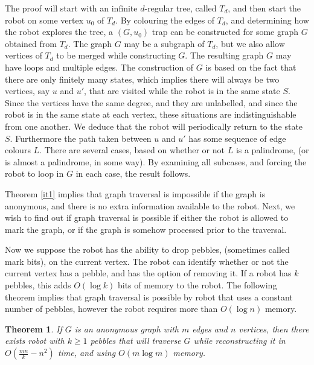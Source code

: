 \documentclass[12pt,letterpaper,oneside]{book}
\newtheorem{theorem}{Theorem}[section]
\begin{document}
The proof will start with an infinite $d$-regular tree, called $T_d$, and then start the robot on some vertex $u_0$ of $T_d$.  
By colouring the edges of $T_d$, and determining how the robot explores the tree, a $(G,u_0)$ trap can be constructed 
for some graph $G$ obtained from $T_d$.  The graph $G$ may be a subgraph of $T_d$, but we also allow vertices of $T_d$ to be 
merged while constructing $G$.  The resulting graph $G$ may have loops and multiple edges.    
The construction of $G$ is based 
on the fact that there are only finitely many states, which implies 
there will always be two vertices, say $u$ and $u'$, that are visited while the robot is in the same state $S$.  Since 
the vertices have the same degree, and they are unlabelled, and since the robot is in the same state at each vertex, these situations 
are indistinguishable from one another.  We deduce 
that the robot will periodically return to the state $S$.  Furthermore the path taken between $u$ and $u'$ has some sequence of edge colours $L$.  
There are several cases, based on whether or not $L$ is a palindrome, (or is almost a palindrome, in some way).  By examining 
all subcases, and forcing the robot to loop in $G$ in each case, the result follows.


Theorem \ref{it1} implies that graph traversal is impossible if the graph is anonymous, and there is no extra information available to 
the robot.  Next, we wish to find out 
if graph traversal is possible if either the robot is allowed to mark the graph, or if the graph is somehow processed 
prior to the traversal.  


  
Now we suppose the robot has 
the ability to drop pebbles, (sometimes called mark bits), on the current vertex.  
The robot can identify whether or not the current vertex has a pebble, and has the option of removing it.  
If a robot has $k$ pebbles, this adds $O(\log k)$ bits of memory to the robot.   
The following theorem implies that graph traversal is possible by robot that uses a constant number of pebbles, however the 
robot requires 
more than $O(\log n)$ memory.  



\begin{theorem}\label{mk}
\emph{\cite{DJMW}} If $G$ is an anonymous graph with $m$ edges and $n$ vertices, then there exists robot with $k\ge 1$ pebbles that 
will traverse $G$ while reconstructing it in $O(\frac{mn}{k}-n^2)$ time, and using $O(m\log m)$ memory.  
\end{theorem}  
\end{document}
